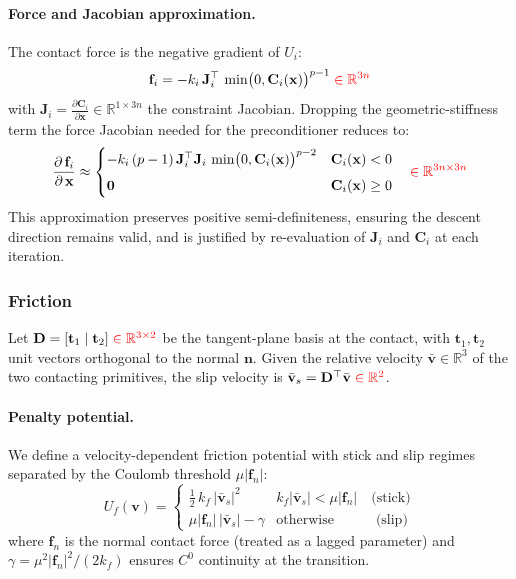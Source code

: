\documentclass{article}
\newcommand{\pd}[2]{\dfrac{\partial\, #1}{\partial\, #2}}
\newcommand{\pdc}[2]{\frac{\partial #1}{\partial #2}}
\newcommand{\red}[1]{\textcolor{red}{#1}}
\begin{document}
\paragraph{Force and Jacobian approximation.}
The contact force is the negative gradient of $U_i$:
\begin{equation}
    \mathbf{f}_i = -k_i\, \mathbf{J}_i^\top\, \min\bigl(0, \mathbf{C}_i(\mathbf{x})\bigr)^{p-1}
    \;\red{\in \mathbb{R}^{3n}}
\end{equation}
with $\mathbf{J}_i = \pdc{\mathbf{C}_i}{\mathbf{x}} \in \mathbb{R}^{1 \times 3n}$ the constraint Jacobian. Dropping the geometric-stiffness term the force Jacobian needed for the preconditioner reduces to:
\begin{equation}
    \pd{\mathbf{f}_i}{\mathbf{x}} \approx
    \begin{cases}
        -k_i\,(p-1)\,\mathbf{J}_i^\top \mathbf{J}_i\, \min\bigl(0, \mathbf{C}_i(\mathbf{x})\bigr)^{p-2}
        & \mathbf{C}_i(\mathbf{x}) < 0 \\[1ex]
        \mathbf{0} & \mathbf{C}_i(\mathbf{x}) \geq 0
    \end{cases}
    \quad\red{\in \mathbb{R}^{3n\times3n}}
\end{equation}
This approximation preserves positive semi-definiteness, ensuring the descent direction remains valid, and is justified by re-evaluation of $\mathbf{J}_i$ and $\mathbf{C}_i$ at each iteration.

\subsubsection{Friction}

Let $\mathbf{D} = [\mathbf{t}_1 \mid \mathbf{t}_2] \;\red{\in \mathbb{R}^{3 \times 2}}$ be the tangent-plane basis at the contact, with $\mathbf{t}_1, \mathbf{t}_2$ unit vectors orthogonal to the normal $\mathbf{n}$. Given the relative velocity $\bar{\mathbf{v}} \in \mathbb{R}^3$ of the two contacting primitives, the slip velocity is $\bar{\mathbf{v}}_s = \mathbf{D}^\top \bar{\mathbf{v}} \;\red{\in \mathbb{R}^2}$.

\paragraph{Penalty potential.}
We define a velocity-dependent friction potential with stick and slip regimes separated by the Coulomb threshold $\mu|\mathbf{f}_n|$:
\begin{equation}
    U_f(\mathbf{v}) = 
    \begin{cases}
        \tfrac{1}{2}\,k_f\,|\bar{\mathbf{v}}_s|^2 
        & k_f|\bar{\mathbf{v}}_s| < \mu|\mathbf{f}_n| \quad\text{(stick)} \\[1ex]
        \mu|\mathbf{f}_n|\,|\bar{\mathbf{v}}_s| - \gamma 
        & \text{otherwise} \quad\qquad\text{(slip)}
    \end{cases}
\end{equation}
where $\mathbf{f}_n$ is the normal contact force (treated as a lagged parameter) and $\gamma = \mu^2|\mathbf{f}_n|^2/(2k_f)$ ensures $C^0$ continuity at the transition. 
\end{document}
